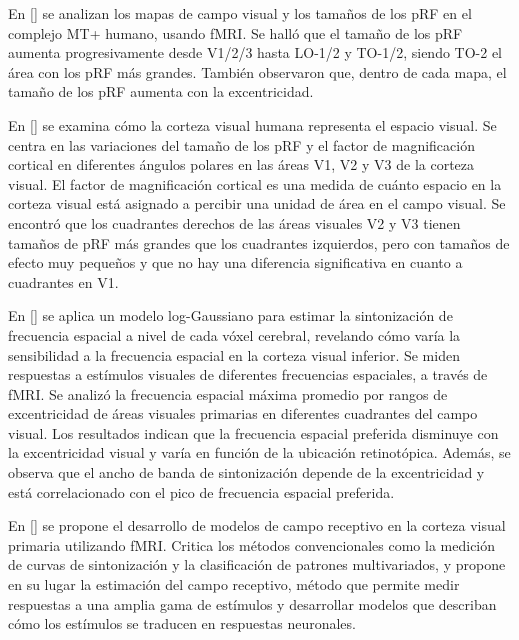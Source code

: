 En [\cite{amano_visual_2009}] se analizan los mapas de campo visual y los tamaños de los pRF en el complejo MT+ humano, usando fMRI. Se halló que el tamaño de los pRF aumenta progresivamente desde V1/2/3 hasta LO-1/2 y TO-1/2, siendo TO-2 el área con los pRF más grandes. También observaron que, dentro de cada mapa, el tamaño de los pRF aumenta con la excentricidad.

En [\cite{silva_radial_2018}] se examina cómo la corteza visual humana representa el espacio visual. Se centra en las variaciones del tamaño de los pRF y el factor de magnificación cortical en diferentes ángulos polares en las áreas V1, V2 y V3 de la corteza visual. El factor de magnificaci\'on cortical es una medida de cuánto espacio en la corteza visual está asignado a percibir una unidad de área en el campo visual. Se encontr\'o que los cuadrantes derechos de las \'areas visuales V2 y V3 tienen tamaños de pRF más grandes que los cuadrantes izquierdos, pero con tamaños de efecto muy pequeños y que no hay una diferencia significativa en cuanto a cuadrantes en V1. 


En [\cite{aghajari_population_2020}] se aplica un modelo log-Gaussiano para estimar la sintonización de frecuencia espacial a nivel de cada vóxel cerebral, revelando cómo varía la sensibilidad a la frecuencia espacial en la corteza visual inferior. Se miden respuestas a estímulos visuales de diferentes frecuencias espaciales, a través de fMRI. Se analiz\'o la frecuencia espacial m\'axima promedio por rangos de excentricidad de \'areas visuales primarias en diferentes cuadrantes del campo visual. Los resultados indican que la frecuencia espacial preferida disminuye con la excentricidad visual y varía en función de la ubicación retinotópica. Además, se observa que el ancho de banda de sintonización depende de la excentricidad y está correlacionado con el pico de frecuencia espacial preferida.

En [\cite{kriegeskorte_understanding_2011}] se propone el desarrollo de modelos de campo receptivo en la corteza visual primaria utilizando fMRI. Critica los métodos convencionales como la medición de curvas de sintonización y la clasificación de patrones multivariados, y propone en su lugar la estimación del campo receptivo, método que permite medir respuestas a una amplia gama de estímulos y desarrollar modelos que describan cómo los estímulos se traducen en respuestas neuronales.

